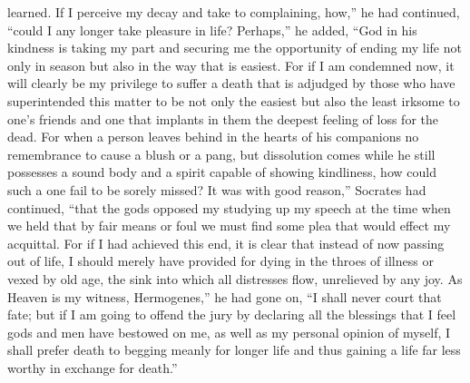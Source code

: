 \documentclass[12pt]{article}
\begin{document}
learned. If I perceive my decay and take to complaining, how,'' he had
continued, ``could I any longer take pleasure in life? Perhaps,'' he added,
``God in his kindness is taking my part and securing me the opportunity of
ending my life not only in season but also in the way that is easiest. For if I
am condemned now, it will clearly be my privilege to suffer a death that is
adjudged by those who have superintended this matter to be not only the easiest
but also the least irksome to one's friends and one that implants in them the
deepest feeling of loss for the dead. For when a person leaves behind in the
hearts of his companions no remembrance to cause a blush or a pang, but
dissolution comes while he still possesses a sound body and a spirit capable of
showing kindliness, how could such a one fail to be sorely missed? It was with
good reason,'' Socrates had continued, ``that the gods opposed my studying up
my speech at the time when we held that by fair means or foul we must find some
plea that would effect my acquittal. For if I had achieved this end, it is
clear that instead of now passing out of life, I should merely have provided
for dying in the throes of illness or vexed by old age, the sink into which all
distresses flow, unrelieved by any joy. As Heaven is my witness, Hermogenes,''
he had gone on, ``I shall never court that fate; but if I am going to offend
the jury by declaring all the blessings that I feel gods and men have bestowed
on me, as well as my personal opinion of myself, I shall prefer death to
begging meanly for longer life and thus gaining a life far less worthy in
exchange for death.''
\end{document}
